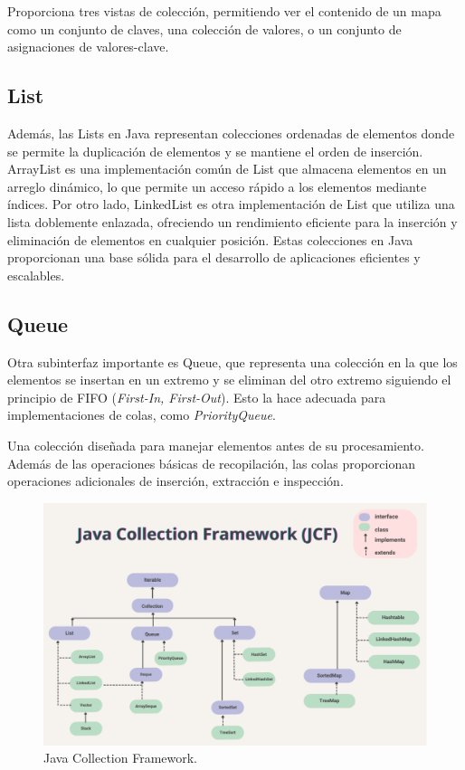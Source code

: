 \documentclass[a4paper,12pt]{article}
\begin{document}
Proporciona tres vistas de colección, permitiendo ver el contenido de un mapa como un conjunto de claves, una colección de valores, o un conjunto de asignaciones de valores-clave.\cite{map}

\subsection{List}

Además, las Lists en Java representan colecciones ordenadas de elementos donde se permite la duplicación de elementos y se mantiene el orden de inserción. ArrayList es una implementación común de List que almacena elementos en un arreglo dinámico, lo que permite un acceso rápido a los elementos mediante índices. Por otro lado, LinkedList es otra implementación de List que utiliza una lista doblemente enlazada, ofreciendo un rendimiento eficiente para la inserción y eliminación de elementos en cualquier posición. Estas colecciones en Java proporcionan una base sólida para el desarrollo de aplicaciones eficientes y escalables.

\subsection{Queue}

Otra subinterfaz importante es Queue, que representa una colección en la que los elementos se insertan en un extremo y se eliminan del otro extremo siguiendo el principio de FIFO (\textit{First-In, First-Out}). Esto la hace adecuada para implementaciones de colas, como \textit{PriorityQueue}.

Una colección diseñada para manejar elementos antes de su procesamiento. Además de las operaciones básicas de recopilación, las colas proporcionan operaciones adicionales de inserción, extracción e inspección. \cite{queue}

\begin{figure}[ht]
    \centering
    \includegraphics[width=.9\textwidth]{media/java_collection_framework.PNG}
    \caption{Java Collection Framework. \cite{nieva-2023}}
    \label{fig:enter-label}
\end{figure}
\end{document}
